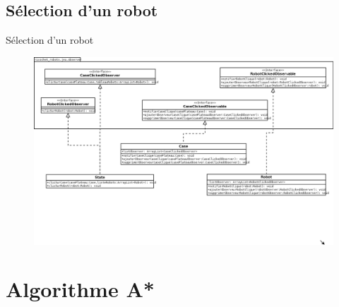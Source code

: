 \documentclass{beamer}
\begin{document}
    \subsection{Sélection d'un robot}
        \begin{frame}{Sélection d'un robot}
            \begin{figure}[H]
                \centering
                \includegraphics[scale=0.2]{images/patternObserver.png}
            \end{figure}
        \end{frame}
\section{Algorithme A*}
\end{document}

